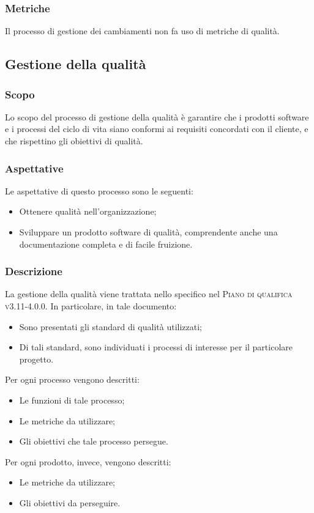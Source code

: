 \documentclass[../norme-di-progetto.tex]{subfiles}
\begin{document}
\subsubsection{Metriche}
Il processo di gestione dei cambiamenti non fa uso di metriche di qualità.

\subsection{Gestione della qualità}
\subsubsection{Scopo}
Lo scopo del processo di gestione della qualità è garantire che i prodotti software e i processi del ciclo di vita siano conformi ai requisiti concordati con il cliente, e che rispettino gli obiettivi di qualità.
\subsubsection{Aspettative}
Le aspettative di questo processo sono le seguenti:
\begin{itemize}
  \item Ottenere qualità nell'organizzazione;
  \item Sviluppare un prodotto software di qualità, comprendente anche una documentazione completa e di facile fruizione.
\end{itemize}
\subsubsection{Descrizione}
La gestione della qualità viene trattata nello specifico nel \textsc{Piano di qualifica v3.11-4.0.0}. In particolare, in tale documento:
\begin{itemize}
  \item Sono presentati gli standard di qualità utilizzati;
  \item Di tali standard, sono individuati i processi di interesse per il particolare progetto.
\end{itemize}
Per ogni processo vengono descritti:
\begin{itemize}
  \item Le funzioni di tale processo;
  \item Le metriche da utilizzare;
  \item Gli obiettivi che tale processo persegue.
\end{itemize}
Per ogni prodotto, invece, vengono descritti:
\begin{itemize}
  \item Le metriche da utilizzare;
  \item Gli obiettivi da perseguire.
\end{itemize}
\end{document}
